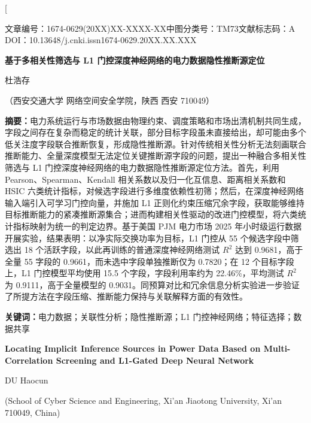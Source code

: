 \documentclass[UTF8,zihao=5,twoside]{ctexart}
\numberwithin{equation}{section}
\newcommand{\articleinfo}{文章编号：1674-0629(20XX)XX-XXXX-XX\quad 中图分类号：TM73\quad 文献标志码：A\\
DOI：10.13648/j.cnki.issn1674-0629.20XX.XX.XXX}
\begin{document}
\twocolumn[

\begin{center}
{\articleinfo}\par\vspace{1.0em}
{\sffamily{}\bfseries 基于多相关性筛选与 L1 门控深度神经网络的电力数据隐性推断源定位}\par\vspace{0.8em}
{杜浩存}\par\vspace{0.4em}
{（西安交通大学 网络空间安全学院，陕西 西安 710049）}\par\vspace{0.8em}
\end{center}

\noindent\textbf{摘要：}电力系统运行与市场数据由物理约束、调度策略和市场出清机制共同生成，字段之间存在复杂而稳定的统计关联，部分目标字段虽未直接给出，却可能由多个低关注度字段联合推断恢复，形成隐性推断源。针对传统相关性分析无法刻画联合推断能力、全量深度模型无法定位关键推断源字段的问题，提出一种融合多相关性筛选与 L1 门控深度神经网络的电力数据隐性推断源定位方法。首先，利用 Pearson、Spearman、Kendall 相关系数以及归一化互信息、距离相关系数和 HSIC 六类统计指标，对候选字段进行多维度依赖性初筛；然后，在深度神经网络输入端引入可学习门控向量，并施加 L1 正则化约束压缩冗余字段，获取能够维持目标推断能力的紧凑推断源集合；进而构建相关性驱动的改进门控模型，将六类统计指标映射为统一的判定边界。基于美国 PJM 电力市场 2025 年小时级运行数据开展实验，结果表明：以净实际交换功率为目标，L1 门控从 55 个候选字段中筛选出 18 个活跃字段，以此再训练的普通深度神经网络测试 $R^2$ 达到 0.9681，高于全量 55 字段的 0.9661，而未选中字段单独推断仅为 0.7820；在 12 个目标字段上，L1 门控模型平均使用 15.5 个字段，字段利用率约为 22.46\%，平均测试 $R^2$ 为 0.9111，高于全量模型的 0.9031。同预算对比和冗余信息分析实验进一步验证了所提方法在字段压缩、推断能力保持与关联解释方面的有效性。\par
\noindent\textbf{关键词：}电力数据；关联性分析；隐性推断源；L1 门控神经网络；特征选择；数据共享\par\vspace{0.8em}

\begin{center}
{\bfseries\large Locating Implicit Inference Sources in Power Data Based on Multi-Correlation Screening and L1-Gated Deep Neural Network}\par\vspace{0.5em}
{DU Haocun}\par\vspace{0.3em}
{\small (School of Cyber Science and Engineering, Xi'an Jiaotong University, Xi'an 710049, China)}\par\vspace{0.5em}
\end{center}
\end{document}
